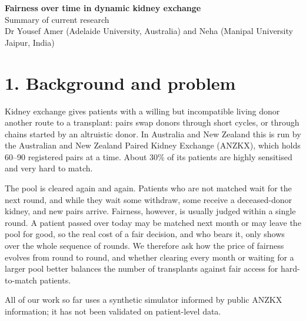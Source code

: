 \documentclass[10pt]{article}
\begin{document}
{\Large\bfseries Fairness over time in dynamic kidney exchange}\\[2pt]
{\large Summary of current research}\\[4pt]
{\small Dr Yousef Amer (Adelaide University, Australia) and Neha (Manipal University Jaipur, India)}

\section*{1. Background and problem}
Kidney exchange gives patients with a willing but incompatible living donor another
route to a transplant: pairs swap donors through short cycles, or through chains
started by an altruistic donor. In Australia and New Zealand this is run by the
Australian and New Zealand Paired Kidney Exchange (ANZKX), which holds 60--90
registered pairs at a time. About 30\% of its patients are highly sensitised and very
hard to match.

The pool is cleared again and again. Patients who are not matched wait for the next
round, and while they wait some withdraw, some receive a deceased-donor kidney, and new
pairs arrive. Fairness, however, is usually judged within a single round. A patient
passed over today may be matched next month or may leave the pool for good, so the real
cost of a fair decision, and who bears it, only shows over the whole sequence of rounds.
We therefore ask how the price of fairness evolves from round to round, and whether
clearing every month or waiting for a larger pool better balances the number of
transplants against fair access for hard-to-match patients.

All of our work so far uses a synthetic simulator informed by public ANZKX information;
it has not been validated on patient-level data.
\end{document}
